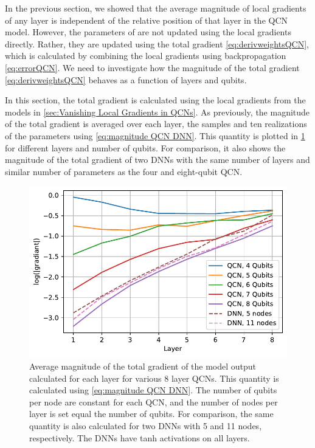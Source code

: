 
In the previous section, we showed that the average magnitude of local gradients of any layer is independent of the relative position of that layer in the QCN model. However, the parameters of are not updated using the local gradients directly. Rather, they are updated using the total gradient \cref{eq:derivweightsQCN}, which is calculated by combining the local gradients using backpropagation \cref{eq:errorQCN}. We need to investigate how the magnitude of the total gradient \cref{eq:derivweightsQCN} behaves as a function of layers and qubits. 

In this section, the total gradient is calculated using the local gradients from the models in \cref{sec:Vanishing Local Gradients in QCNs}. As previously, the magnitude of the total gradient is averaged over each layer, the samples and ten realizations of the parameters using \cref{eq:magnitude QCN DNN}. This quantity is plotted in \cref{fig:QNC_vanishing_total} for different layers and number of qubits. For comparison, it also shows the magnitude of the total gradient of two DNNs with the same number of layers and similar number of parameters as the four and eight-qubit QCN.

\begin{figure}[H]
    \centering
    \includegraphics[width=12cm]{latex/figures/vanishing_gradient_total.pdf}
    \caption{Average magnitude of the total gradient of the model output calculated for each layer for various 8 layer QCNs. This quantity is calculated using \cref{eq:magnitude QCN DNN}. The number of qubits per node are constant for each QCN, and the number of nodes per layer is set equal the number of qubits.  For comparison, the same quantity is also calculated for two DNNs with 5 and 11 nodes, respectively. The DNNs have tanh activations on all layers.}
    \label{fig:QNC_vanishing_total}
\end{figure}

